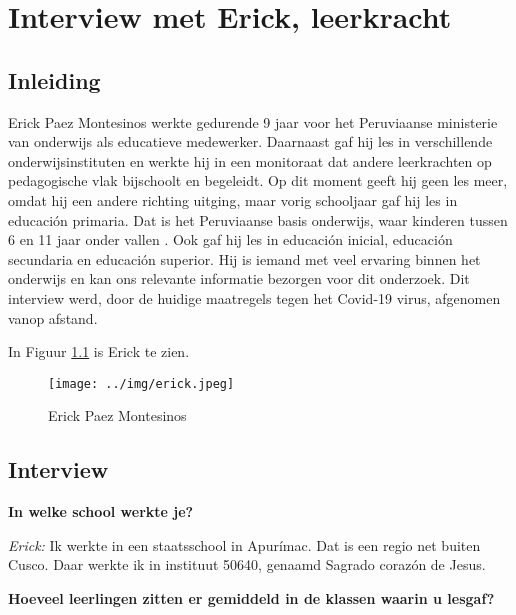 \chapter{Interview met Erick, leerkracht}
\label{ch:interviewErick}

\section{Inleiding}
Erick Paez Montesinos werkte gedurende 9 jaar voor het Peruviaanse ministerie van onderwijs als educatieve medewerker. Daarnaast gaf hij les in verschillende onderwijsinstituten en werkte hij in een monitoraat dat andere leerkrachten op pedagogische vlak bijschoolt en begeleidt. Op dit moment geeft hij geen les meer, omdat hij een andere richting uitging, maar vorig schooljaar gaf hij les in educación primaria. Dat is het Peruviaanse basis onderwijs, waar kinderen tussen 6 en 11 jaar onder vallen \autocite{Nuffic2015}. Ook gaf hij les in educación inicial, educación secundaria en educación superior. Hij is iemand met veel ervaring binnen het onderwijs en kan ons relevante informatie bezorgen voor dit onderzoek. Dit interview werd, door de huidige maatregels tegen het Covid-19 virus, afgenomen vanop afstand.

 In Figuur \ref{erick} is Erick te zien.
 
 \begin{figure}[h!]
 	\texttt{[image: ../img/erick.jpeg]}
 	\caption{Erick Paez Montesinos }
 	\label{erick}
 \end{figure}

\section{Interview}

\textbf{In welke school werkte je?}

\textit{Erick:} Ik werkte in een staatsschool in Apurímac. Dat is een regio net buiten Cusco. Daar werkte ik in instituut 50640, genaamd Sagrado corazón de Jesus.

\textbf{Hoeveel leerlingen zitten er gemiddeld in de klassen waarin u lesgaf?}

